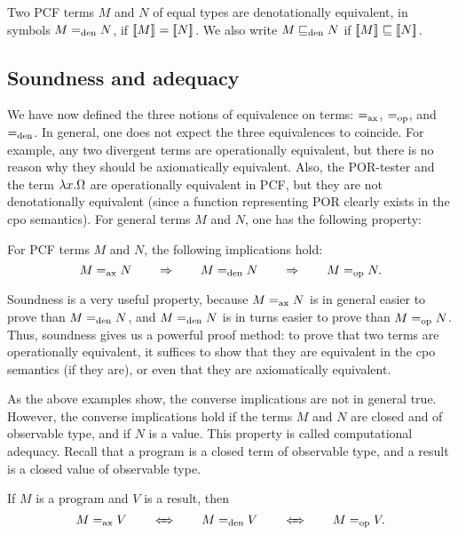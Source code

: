\documentclass{article}
\begin{document}
\begin{definition}
  Two PCF terms $M$ and $N$ of equal types are denotationally
  equivalent, in symbols $M=_{\rm den} N$, if $[\![M]\!]_{}=[\![N]\!]_{}$. 
  We also write $M\sqsubseteq_{\rm den} N$ if $[\![M]\!]_{}\sqsubseteq[\![N]\!]_{}$.
\end{definition}

\subsection{Soundness and adequacy}

We have now defined the three notions of equivalence on terms:
$=_{\rm ax}$, $=_{\rm op}$, and $=_{\rm den}$. In general, one does not expect the
three equivalences to coincide. For example, any two divergent terms
are operationally equivalent, but there is no reason why they should
be axiomatically equivalent. Also, the POR-tester and the term $\lambda
x.\Omega$ are operationally equivalent in PCF, but they are not
denotationally equivalent (since a function representing POR clearly
exists in the cpo semantics). For general terms $M$ and $N$, one has
the following property:

\begin{theorem}[Soundness]
  For PCF terms $M$ and $N$, the following implications hold:
  \[ M=_{\rm ax} N \hspace{2em}\Rightarrow\hspace{2em} M=_{\rm den} N  \hspace{2em}\Rightarrow\hspace{2em}  M=_{\rm op} N.
  \]
\end{theorem}

Soundness is a very useful property, because $M=_{\rm ax} N$ is in general
easier to prove than $M=_{\rm den} N$, and $M=_{\rm den} N$ is in turns easier
to prove than $M=_{\rm op} N$. Thus, soundness gives us a powerful proof
method: to prove that two terms are operationally equivalent, it
suffices to show that they are equivalent in the cpo semantics (if
they are), or even that they are axiomatically equivalent. 

As the above examples show, the converse implications are not in
general true. However, the converse implications hold if the terms $M$
and $N$ are closed and of observable type, and if $N$ is a value. This
property is called computational adequacy. Recall that a program is a
closed term of observable type, and a result is a closed value of
observable type. 

\begin{theorem}
  If $M$ is a program and $V$ is a result, then
  \[ M=_{\rm ax} V \hspace{2em}\Leftarrow\!\!\!\Rightarrow\hspace{2em} M=_{\rm den} V  \hspace{2em}\Leftarrow\!\!\!\Rightarrow\hspace{2em}  M=_{\rm op} V.
  \]
\end{theorem}
\end{document}
